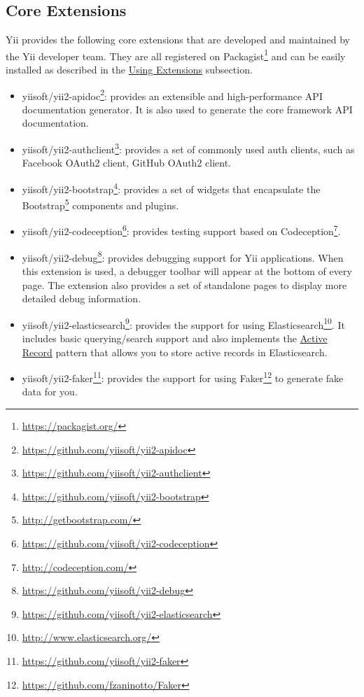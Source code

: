 \subsection{Core Extensions \label{structure-extensions.md::core-extensions}}
Yii provides the following core extensions that are developed and maintained by the Yii developer team. They are all
registered on Packagist\footnote{\url{https://packagist.org/}} and can be easily installed as described in the
\hyperref[structure-extensions.md::::using-extensions]{Using Extensions} subsection.

\begin{itemize}
\item yiisoft/yii2-apidoc\footnote{\url{https://github.com/yiisoft/yii2-apidoc}}:
provides an extensible and high-performance API documentation generator. It is also used to generate the core
framework API documentation.
\item yiisoft/yii2-authclient\footnote{\url{https://github.com/yiisoft/yii2-authclient}}:
provides a set of commonly used auth clients, such as Facebook OAuth2 client, GitHub OAuth2 client.
\item yiisoft/yii2-bootstrap\footnote{\url{https://github.com/yiisoft/yii2-bootstrap}}:
provides a set of widgets that encapsulate the Bootstrap\footnote{\url{http://getbootstrap.com/}} components and plugins.
\item yiisoft/yii2-codeception\footnote{\url{https://github.com/yiisoft/yii2-codeception}}:
provides testing support based on Codeception\footnote{\url{http://codeception.com/}}.
\item yiisoft/yii2-debug\footnote{\url{https://github.com/yiisoft/yii2-debug}}:
provides debugging support for Yii applications. When this extension is used, a debugger toolbar will appear
at the bottom of every page. The extension also provides a set of standalone pages to display more detailed
debug information.
\item yiisoft/yii2-elasticsearch\footnote{\url{https://github.com/yiisoft/yii2-elasticsearch}}:
provides the support for using Elasticsearch\footnote{\url{http://www.elasticsearch.org/}}. It includes basic querying/search
support and also implements the \hyperref[db-active-record.md]{Active Record} pattern that allows you to store active records
in Elasticsearch.
\item yiisoft/yii2-faker\footnote{\url{https://github.com/yiisoft/yii2-faker}}:
provides the support for using Faker\footnote{\url{https://github.com/fzaninotto/Faker}} to generate fake data for you.

\end{itemize}
